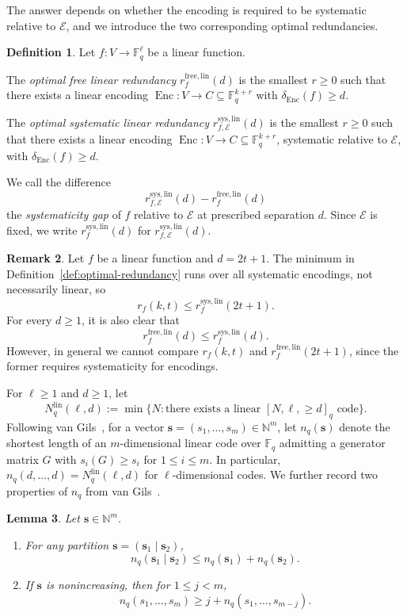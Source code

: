 \documentclass[a4paper,12pt]{article}
\theoremstyle{plain}
\newtheorem{lemma}{Lemma}[section]
\theoremstyle{definition}
\newtheorem{definition}[lemma]{Definition}
\newtheorem{remark}[lemma]{Remark}
\newcommand{\F}{\mathbb F}
\newcommand{\Enc}{\operatorname{Enc}}
\newcommand{\Nlin}{N_q^{\mathrm{lin}}}
\begin{document}
The answer depends on whether the encoding is required to be systematic
relative to $\mathcal E$, and we introduce the two corresponding
optimal redundancies.

\begin{definition}
\label{def:free-systematic-redundancy}
Let $f\colon V\to\F_q^\ell$ be a linear function.

The \emph{optimal free linear redundancy} $r_f^{\mathrm{free,lin}}(d)$
is the smallest $r\geq0$ such that there exists a linear encoding
$\Enc\colon V\to C\subseteq\F_q^{k+r}$ with $\delta_{\Enc}(f)\geq d$.

The \emph{optimal systematic linear redundancy}
$r_{f,\mathcal E}^{\mathrm{sys,lin}}(d)$ is the smallest $r\geq0$
such that there exists a linear encoding
$\Enc\colon V\to C\subseteq\F_q^{k+r}$, systematic relative to $\mathcal E$,
with $\delta_{\Enc}(f)\geq d$.

We call the difference
\[
r_{f,\mathcal E}^{\mathrm{sys,lin}}(d)
-
r_f^{\mathrm{free,lin}}(d)
\]
the \emph{systematicity gap} of $f$ relative to
$\mathcal E$ at prescribed separation $d$.
Since $\mathcal E$ is fixed, we write $r_f^{\mathrm{sys,lin}}(d)$
for $r_{f,\mathcal E}^{\mathrm{sys,lin}}(d)$.
\end{definition} 


\begin{remark}
\label{rem:optimal-redundancy-relation}
Let $f$ be a linear function and $d=2t+1$. 
The minimum in
Definition~\ref{def:optimal-redundancy} runs over all systematic encodings, not necessarily linear, so
\[
r_f(k,t)\leq r_f^{\mathrm{sys,lin}}(2t+1).
\]
For every $d\geq1$, it is also clear that
\[
r_f^{\mathrm{free,lin}}(d)\leq r_f^{\mathrm{sys,lin}}(d).
\] 
However, in general  we cannot compare $r_f(k,t)$ and $r_f^{\mathrm{free,lin}}(2t+1)$, since the former requires systematicity for encodings.
\end{remark}

For $\ell\geq1$ and $d\geq1$, let
\[
\Nlin(\ell,d)
:=
\min\{N:\text{there exists a linear }[N,\ell,\geq d]_q\text{ code}\}.
\]
Following van Gils~\cite[Definition~4]{vangils1983}, for a  vector
$\mathbf s=(s_1,\dots,s_m)\in\mathbb N^m$, let $n_q(\mathbf s)$
denote the shortest length of an $m$-dimensional linear code over
$\F_q$ admitting a generator matrix $G$ with
$s_i(G)\geq s_i$ for $1\leq i\leq m$. In particular,
$n_q(d,\dots,d)=\Nlin(\ell,d)$ for $\ell$-dimensional codes. We further record two properties of $n_q$ from  van Gils~\cite[Theorem~4, Corollary~9]{vangils1983}.
\begin{lemma}
\label{lem:vangils-bounds}
Let $\mathbf s\in\mathbb N^m$.
\begin{enumerate}
\item For any partition $\mathbf s=(\mathbf s_1\mid\mathbf s_2)$,
\[
n_q(\mathbf s_1\mid\mathbf s_2)\leq n_q(\mathbf s_1)+n_q(\mathbf s_2).
\]
\item If $\mathbf s$ is nonincreasing, then for $1\leq j<m$,
\[
n_q(s_1,\dots,s_m)\geq j+n_q(s_1,\dots,s_{m-j}).
\]
\end{enumerate}
\end{lemma}
\end{document}
